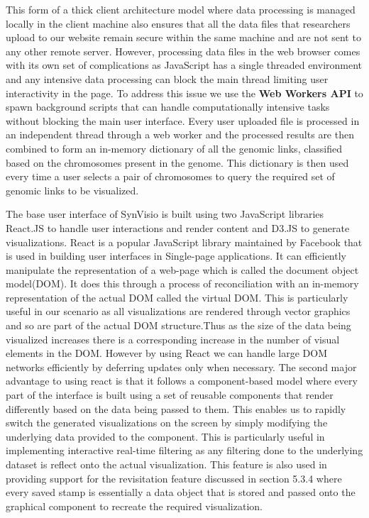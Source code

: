 This form of a thick client architecture model where data processing is managed locally in the client machine also ensures that all the data files that researchers upload to our website remain secure within the same machine and are not sent to any other remote server. However, processing data files in the web browser comes with its own set of complications as JavaScript has a single threaded environment and any intensive data processing can block the main thread limiting user interactivity in the page. To address this issue we use the \textbf{Web Workers API} to spawn background scripts that can handle computationally intensive tasks without blocking the main user interface\cite{webworkers}. Every user uploaded file is processed in an independent thread through a web worker and the processed results are then combined to form an in-memory dictionary of all the genomic links, classified based on the chromosomes present in the genome. This dictionary is then used every time a user selects a pair of chromosomes to query the required set of genomic links to be visualized.

The base user interface of SynVisio is built using two JavaScript libraries React.JS\cite{react} to handle user interactions and render content and D3.JS\cite{d3js} to generate visualizations.
React is a popular JavaScript library maintained by Facebook\cite{facebook} that is used in building user interfaces in Single-page applications. It can efficiently manipulate the representation of a web-page which is called the document object model(DOM). It does this through a process of reconciliation with an in-memory representation of the actual DOM called the virtual DOM. This is particularly useful in our scenario as all visualizations are rendered through vector graphics and so are part of the actual DOM structure.Thus as the size of the data being visualized increases there is a corresponding increase in the number of visual elements in the DOM. However by using React we can handle large DOM networks efficiently by deferring updates only when necessary. The second major advantage to using react is that it follows a component-based model where every part of the interface is built using a set of reusable components that render differently based on the data being passed to them. This enables us to rapidly switch the generated visualizations on the screen by simply modifying the underlying data provided to the component. This is particularly useful in implementing interactive real-time filtering as any filtering done to the underlying dataset is reflect onto the actual visualization. This feature is also used in providing support for the revisitation feature discussed in section 5.3.4 where every saved stamp is essentially a data object that is stored and passed onto the graphical component to recreate the required visualization.

